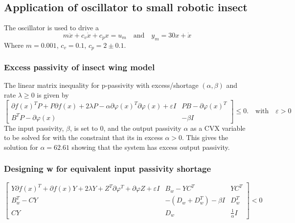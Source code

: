 \documentclass{article}
\begin{document}
\subsection{Application of oscillator to small robotic insect}

The oscillator is used to drive a 
\begin{equation}
    m\ddot{x} + c_v \dot{x} + c_p x = u_m \quad \text{and} \quad y_m = 30x + \dot{x}
\end{equation}
Where $m = 0.001$, $c_v = 0.1$, $c_p = 2 \pm 0.1$.

\subsubsection{Excess passivity of insect wing model}

The linear matrix inequality for p-passivity with excess/shortage $(\alpha, \beta)$ and rate $\lambda \geq0$ is given by
\begin{equation}
    \left[
    \begin{array}{cc}
    \partial f(x)^T P + P \partial f(x) + 2 \lambda P - \alpha \partial \varphi(x)^T \partial \varphi(x) + \varepsilon I & P B - \partial \varphi(x)^T \\
    B^T P - \partial \varphi(x) & -\beta I
    \end{array}
    \right] \leq 0. \quad \text{with} \quad \varepsilon > 0
\end{equation}
The input passivity, $\beta$, is set to 0, and the output passivity $\alpha$ as a CVX variable to be solved for with the constraint that its in excess $\alpha > 0$.
This gives the solution for $\alpha = 62.61$ showing that the system has excess output passivity.

\subsubsection{Designing w for equivalent input passivity shortage}

\begin{equation}
\left[
\begin{array}{ccc}
Y \partial f(x)^T + \partial f(x) Y + 2\lambda Y + Z^T \partial \varphi^T + \partial \varphi Z + \varepsilon I & B_w - Y C^T & Y C^T \\
B_w^T - C Y & -(D_w + D_w^T) - \beta I & D_w^T \\
C Y & D_w & \frac{1}{\alpha} I
\end{array}
\right] < 0 \label{eq:mega_lmi}
\end{equation}
\end{document}
